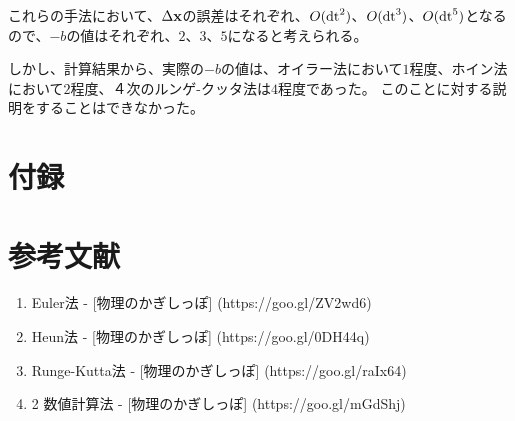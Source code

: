 \documentclass[11pt]{jsarticle}
\newcommand{\xb}{{\bf x}}
\newcommand{\dtn}{{\rm dt}}
\begin{document}
            これらの手法において、$\Delta \xb$の誤差はそれぞれ、$O(\dtn^2)$、$O(\dtn^3)$、$O(\dtn^5)$となるので、$-b$の値はそれぞれ、$2$、$3$、$5$になると考えられる。

            しかし、計算結果から、実際の$-b$の値は、オイラー法において$1$程度、ホイン法において$2$程度、４次のルンゲ-クッタ法は$4$程度であった。
            このことに対する説明をすることはできなかった。

    \section{付録}

    \section{参考文献}
        \begin{enumerate}
            \item Euler法 - [物理のかぎしっぽ] (https://goo.gl/ZV2wd6)
            \item Heun法 - [物理のかぎしっぽ] (https://goo.gl/0DH44q)
            \item Runge-Kutta法 - [物理のかぎしっぽ] (https://goo.gl/raIx64)
            \item 2 数値計算法 - [物理のかぎしっぽ] (https://goo.gl/mGdShj)
        \end{enumerate}
\end{document}
